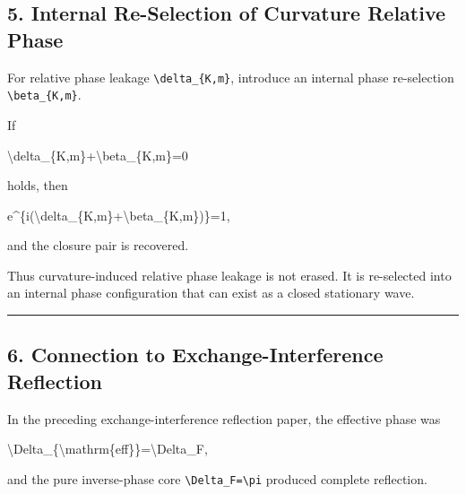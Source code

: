 \documentclass[
  a4paper,
]{article}
\newenvironment{Shaded}{}{}
\newcommand{\NormalTok}[1]{#1}
\begin{document}
\subsection{5. Internal Re-Selection of Curvature Relative
Phase}\label{internal-re-selection-of-curvature-relative-phase}

For relative phase leakage \texttt{\textbackslash{}delta\_\{K,m\}},
introduce an internal phase re-selection
\texttt{\textbackslash{}beta\_\{K,m\}}.

If

\begin{Shaded}
\begin{Highlighting}[]
\NormalTok{\textbackslash{}delta\_\{K,m\}+\textbackslash{}beta\_\{K,m\}=0}
\end{Highlighting}
\end{Shaded}

holds, then

\begin{Shaded}
\begin{Highlighting}[]
\NormalTok{e\^{}\{i(\textbackslash{}delta\_\{K,m\}+\textbackslash{}beta\_\{K,m\})\}=1,}
\end{Highlighting}
\end{Shaded}

and the closure pair is recovered.

Thus curvature-induced relative phase leakage is not erased. It is
re-selected into an internal phase configuration that can exist as a
closed stationary wave.

\begin{center}\rule{0.5\linewidth}{0.5pt}\end{center}

\subsection{6. Connection to Exchange-Interference
Reflection}\label{connection-to-exchange-interference-reflection}

In the preceding exchange-interference reflection paper, the effective
phase was

\begin{Shaded}
\begin{Highlighting}[]
\NormalTok{\textbackslash{}Delta\_\{\textbackslash{}mathrm\{eff\}\}=\textbackslash{}Delta\_F,}
\end{Highlighting}
\end{Shaded}

and the pure inverse-phase core
\texttt{\textbackslash{}Delta\_F=\textbackslash{}pi} produced complete
reflection.
\end{document}
